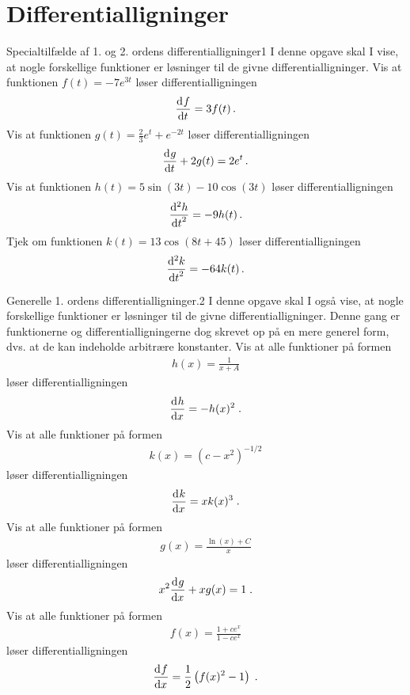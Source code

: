 \section*{Differentialligninger}
\begin{opgave}{Specialtilfælde af 1. og 2. ordens differentialligninger}{1}
I denne opgave skal I vise, at nogle forskellige funktioner er løsninger til de givne differentialligninger.
\opg Vis at funktionen $f(t) = -7e^{3t}$ løser differentialligningen 
\begin{align*}
\dif{t}{f} = 3 f(t) \, .
\end{align*}
\opg Vis at funktionen $g(t) = \frac{2}{3}e^t + e^{-2t}$ løser differentialligningen
\begin{align*}
\dif{t}{g} +2g(t) = 2e^t \, .
\end{align*}
\opg Vis at funktionen $h(t) = 5 \sin (3t) - 10 \cos(3t)$ løser differentialligningen
\begin{align*}
\dif[2]{t}{h} = -9h(t) \, .
\end{align*}
\opg Tjek om funktionen $k(t) = 13 \cos (8t + 45)$ løser differentialligningen
\begin{align*}
\dif[2]{t}{k} = -64k(t) \, .
\end{align*}
\end{opgave}
\begin{opgave}{Generelle 1. ordens differentialligninger.}{2}
I denne opgave skal I også vise, at nogle forskellige funktioner er løsninger til de givne differentialligninger. Denne gang er funktionerne og differentialligningerne dog skrevet op på en mere generel form, dvs. at de kan indeholde arbitrære konstanter.
\opg Vis at alle funktioner på formen
\begin{align*}
	h(x) = \frac{1}{x + A} 
\end{align*}
løser differentialligningen
\begin{align*}
	\dif{x}{h} = - h(x)^2 \; .
\end{align*}
\opg Vis at alle funktioner på formen
\begin{align*}
	k(x) = \left( c - x^2 \right)^{-1/2}
\end{align*}
løser differentialligningen
\begin{align*}
	\dif{x}{k} = x k(x)^3 \; .
\end{align*}
\opg Vis at alle funktioner på formen
\begin{align*}
	g(x) = \frac{\ln (x) + C}{x}
\end{align*}
løser differentialligningen
\begin{align*}
	x^2 \dif{x}{g} + xg(x) = 1 \; .
\end{align*} 
\opg Vis at alle funktioner på formen
\begin{align*}
	f(x) = \frac{1 + ce^x}{1-ce^x}
\end{align*}
løser differentialligningen
\begin{align*}
	\dif{x}{f} = \frac{1}{2} \left( f(x)^2 - 1 \right) \; .
\end{align*} 
\end{opgave}
